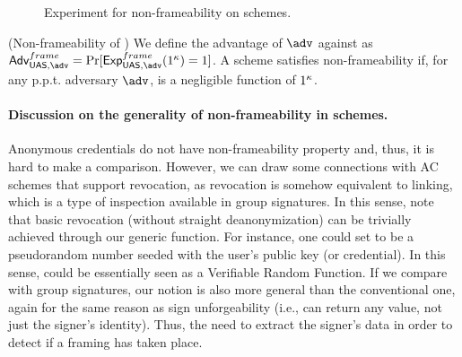 \begin{figure}[htp!]
  \caption{Experiment for non-frameability on \UAS schemes.}
  \label{fig:exp-uas-frame}
\end{figure}

\begin{definition}{(Non-frameability of \UAS)}
  \label{def:frame-uas}
  We define the advantage \AdvNonframe of $\adv$ against \ExpNonframe as
  $\AdvNonframe=\Pr\lbrack\ExpNonframe(1^\secpar)=1\rbrack$.
  A \GSAC scheme satisfies non-frameability if, for any p.p.t. adversary $\adv$,
  \AdvNonframe is a negligible function of $1^\kappa$.
\end{definition}

\paragraph{Discussion on the generality of non-frameability in \UAS schemes.} %
Anonymous credentials do not have non-frameability property and, thus, it is
hard to make a comparison. However, we can draw some connections with AC schemes
that support revocation, as revocation is somehow equivalent to linking, which
is a type of inspection available in group signatures. In this sense, note that
basic revocation (without straight deanonymization) can be trivially achieved
through our generic \Open function. For instance, one could set \finsp to
be a pseudorandom number seeded with the user's public key (or credential). In
this sense, \Open could be essentially seen as a Verifiable Random Function.
If we compare with group signatures, our notion is also more general than the
conventional one, again for the same reason as sign unforgeability (i.e., \Open
can return any value, not just the signer's identity). Thus, the need to extract
the signer's data in order to detect if a framing has taken place.
  
